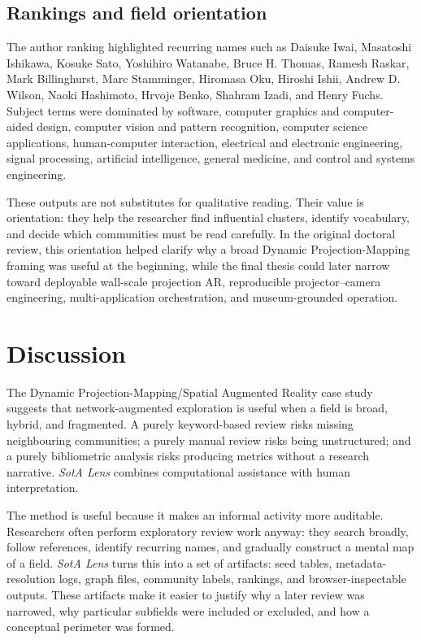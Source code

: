 \documentclass[11pt,a4paper]{article}
\newcommand{\tool}{\emph{SotA Lens}}
\newcommand{\dpm}{Dynamic Projection-Mapping}
\newcommand{\sar}{Spatial Augmented Reality}
\newcommand{\procam}{projector--camera}
\begin{document}
\subsection{Rankings and field orientation}

The author ranking highlighted recurring names such as Daisuke Iwai, Masatoshi Ishikawa, Kosuke Sato, Yoshihiro Watanabe, Bruce H. Thomas, Ramesh Raskar, Mark Billinghurst, Marc Stamminger, Hiromasa Oku, Hiroshi Ishii, Andrew D. Wilson, Naoki Hashimoto, Hrvoje Benko, Shahram Izadi, and Henry Fuchs. Subject terms were dominated by software, computer graphics and computer-aided design, computer vision and pattern recognition, computer science applications, human-computer interaction, electrical and electronic engineering, signal processing, artificial intelligence, general medicine, and control and systems engineering.

These outputs are not substitutes for qualitative reading. Their value is orientation: they help the researcher find influential clusters, identify vocabulary, and decide which communities must be read carefully. In the original doctoral review, this orientation helped clarify why a broad \dpm{} framing was useful at the beginning, while the final thesis could later narrow toward deployable wall-scale projection AR, reproducible \procam{} engineering, multi-application orchestration, and museum-grounded operation.

\section{Discussion}

The \dpm{}/\sar{} case study suggests that network-augmented exploration is useful when a field is broad, hybrid, and fragmented. A purely keyword-based review risks missing neighbouring communities; a purely manual review risks being unstructured; and a purely bibliometric analysis risks producing metrics without a research narrative. \tool{} combines computational assistance with human interpretation.

The method is useful because it makes an informal activity more auditable. Researchers often perform exploratory review work anyway: they search broadly, follow references, identify recurring names, and gradually construct a mental map of a field. \tool{} turns this into a set of artifacts: seed tables, metadata-resolution logs, graph files, community labels, rankings, and browser-inspectable outputs. These artifacts make it easier to justify why a later review was narrowed, why particular subfields were included or excluded, and how a conceptual perimeter was formed.
\end{document}
